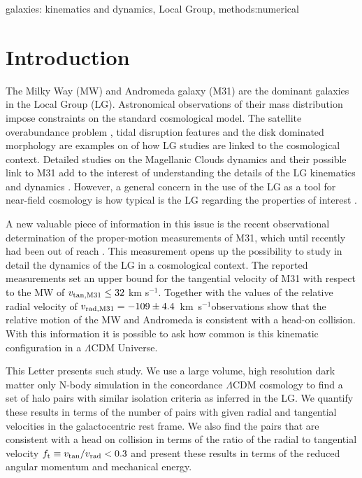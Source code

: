 \documentclass{emulateapj}
\newcommand{\kms}{\,km~s$^{-1}$}
\begin{document}
\begin{keywords}
{galaxies: kinematics and dynamics, Local Group, methods:numerical}
\end{keywords}

\section{Introduction}

The Milky Way (MW) and Andromeda galaxy (M31) are the dominant galaxies in the Local Group (LG). Astronomical observations of their mass distribution impose constraints on the standard cosmological model. The satellite overabundance problem \citep{Klypin99,Moore99}, tidal disruption features \citep{pandas09} and the disk dominated morphology \citep{Kazantzidis2008} are examples on of how LG studies are linked to the cosmological context. Detailed studies on the Magellanic Clouds dynamics and their possible link to M31 add to the interest of understanding the details of the LG kinematics and dynamics \citep{Besla2007,Tollerud2011,Knebe2011,Fouquet2012,Teyssier2012}. However, a general concern in the use of the LG as a tool for near-field cosmology \citep{Freeman2002,Peebles2010} is how typical is the LG regarding the properties of interest \citep{Liu2011,ForeroRomero2011,Purcell2012}. 

A new valuable piece of information in this issue is the recent observational determination of the proper-motion measurements of M31, which until recently had been out of reach \citep{vanderMarel12}. This measurement opens up the possibility to study in detail the dynamics of the LG in a cosmological context. The reported measurements set an upper bound for the tangential velocity of M31 with respect to the MW of $v_{\rm tan,M31}\leq 32$ km s$^{-1}$. Together with the values of the relative radial velocity of $v_{\rm rad,M31}=-109\pm 4.4$ \kms observations show that the relative motion of the MW and Andromeda is consistent with a head-on collision. With this information it is possible to ask how common is this kinematic configuration in a $\Lambda$CDM Universe.

This Letter presents such study. We use a large volume, high resolution dark matter only N-body simulation in the concordance $\Lambda$CDM cosmology to find a set of halo pairs with similar isolation criteria as inferred in the LG. We quantify these results in terms of the number of pairs with given radial and tangential velocities in the galactocentric rest frame. We also find the pairs that are consistent with a head on collision in terms of the ratio of the radial to tangential velocity $f_{\rm t}\equiv v_{\rm tan}/v_{\rm rad}<0.3$ and present these results in terms of the reduced angular momentum and mechanical energy.
\end{document}
